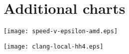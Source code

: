 \documentclass[runningheads]{llncs}
\begin{document}



\appendix
\section{Additional charts}

\texttt{[image: speed-v-epsilon-amd.eps]}

\texttt{[image: clang-local-hh4.eps]}




\end{document}
